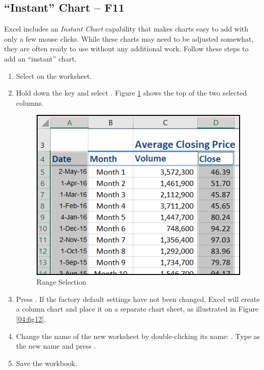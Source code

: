 \subsection{``Instant'' Chart – F11}

Excel includes an \textit{Instant Chart} capability that makes charts easy to add with only a few mouse clicks. While these charts may need to be adjusted somewhat, they are often ready to use without any additional work. Follow these steps to add an ``instant'' chart.

\begin{enumbox}
	\begin{enumerate}
		\item Select  on the  worksheet.
		\item Hold down the  key and select . Figure \ref{04:fig11} shows the top of the two selected columns.
	
		\begin{figure}[H]
			\centering
			\includegraphics[width=\maxwidth{.65\linewidth}]{gfx/ch04_fig11}
			\caption{Range Selection}
			\label{04:fig11}
		\end{figure}
	
		\item Press . If the factory default settings have not been changed, Excel will create a column chart and place it on a separate chart sheet, as illustrated in Figure \ref{04:fig12}.
		\item Change the name of the new worksheet by double-clicking its name: . Type  as the new name and press .
		\item Save the  workbook.
	\end{enumerate}
\end{enumbox}
	

